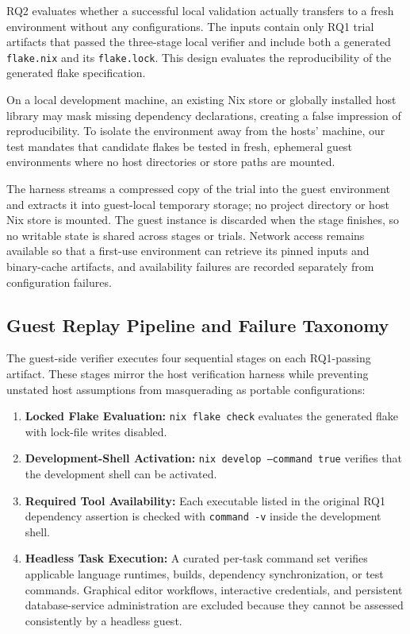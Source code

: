 RQ2 evaluates whether a successful local validation actually transfers to a fresh
environment without any configurations. The inputs contain only RQ1 trial
artifacts that passed the three-stage local verifier and include both a
generated \texttt{flake.nix} and its \texttt{flake.lock}. This design evaluates the
reproducibility of the generated flake specification.

On a local development machine, an existing Nix store or globally installed host
library may mask missing dependency declarations, creating a false impression of reproducibility.
To isolate the environment away from the hosts' machine, our test mandates that
candidate flakes be tested in fresh, ephemeral guest environments where no host directories
or store paths are mounted.

The harness streams a compressed copy of the trial into the guest environment and
extracts it into guest-local temporary storage; no project directory or host Nix
store is mounted. The guest instance is discarded when the stage finishes, so no
writable state is shared across stages or trials. Network access remains available
so that a first-use environment can retrieve its pinned inputs and binary-cache artifacts,
and availability failures are recorded separately from configuration failures.

\subsection{Guest Replay Pipeline and Failure Taxonomy}

The guest-side verifier executes four sequential stages on each RQ1-passing artifact.
These stages mirror the host verification harness while preventing unstated host
assumptions from masquerading as portable configurations:
\begin{enumerate}
	\item \textbf{Locked Flake Evaluation:} \texttt{nix flake check} evaluates the
	      generated flake with lock-file writes disabled.

	\item \textbf{Development-Shell Activation:} \texttt{nix develop --command
		      true} verifies that the development shell can be activated.

	\item \textbf{Required Tool Availability:} Each executable listed in the
	      original RQ1 dependency assertion is checked with \texttt{command -v} inside
	      the development shell.

	\item \textbf{Headless Task Execution:} A curated per-task command set
	      verifies applicable language runtimes, builds, dependency
	      synchronization, or test commands. Graphical editor workflows, interactive
	      credentials, and persistent database-service administration are excluded
	      because they cannot be assessed consistently by a headless guest.
\end{enumerate}

